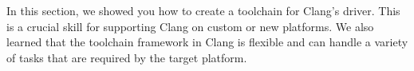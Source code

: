 In this section, we showed you how to create a toolchain for Clang's driver. This is a crucial skill for supporting Clang on custom or new platforms. We also learned that the toolchain framework in Clang is flexible and can handle a variety of tasks that are required by the target platform.
































